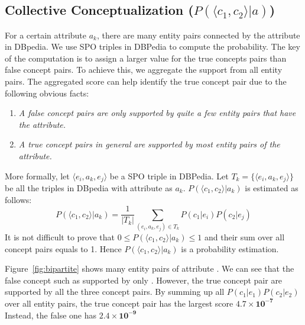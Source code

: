\subsection{Collective Conceptualization ($P( \langle c_{1},c_{2} \rangle |a)$) }
For a certain attribute $a_k$, there are many entity pairs connected by the attribute in DBpedia.
We use SPO triples in DBPedia to compute the probability.
The key of the computation is to assign a larger value for the true concepts pairs than false concept pairs.
To achieve this, we aggregate the support from all entity pairs.
The aggregated score can help identify the true concept pair due to the following
obvious facts:
\begin{enumerate}
\item \emph{A false concept pairs are only supported by quite a few
entity pairs that have the attribute.}
\item \emph{A true concept pairs in general are supported by most entity pairs of the attribute.}
\end{enumerate}

More formally, let $ \langle e_i, a_k, e_j \rangle $ be a SPO triple in DBPedia.
Let $T_k=\{\langle e_i, a_k, e_j \rangle\}$ be all the triples in DBpedia with attribute as $a_k$.
$P( \langle c_1, c_2 \rangle |a_k)$ is estimated as follows:
\begin{equation}
P(\langle c_1, c_2\rangle|a_k)= \frac{1}{|T_k|}\sum_{  (e_{i},a_k,e_{j})\in T_k } P(c_1|e_{i})P(c_2|e_{j})
\label{eq:pccga}
\end{equation}
It is not difficult to prove that $0\leq P( \langle c_1, c_2 \rangle |a_k)\leq 1$ and their sum over all concept pairs equals to 1.
Hence $P( \langle c_1, c_2 \rangle |a_k)$ is a probability estimation.

\begin{example}
\label{exa:pggga}
Figure~\ref{fig:bipartite} shows many entity pairs of attribute . 
We can see that the false concept such as  supported by only .
However, the true concept pair  are supported by all the three concept pairs. 
By summing up all $P(c_1|e_1)P(c_2|e_2) $ over all entity pairs, the true concept pair  has the largest score $\mathbf{4.7\times10^{-7}}$ 
Instead, the false one  has $\mathbf{2.4\times10^{-9}}$
\end{example}


